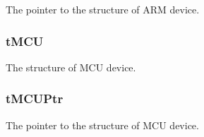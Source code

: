 The pointer to the structure of A\-R\-M device. \hypertarget{group___sys_glb_var_ga1da6113a394709910a14e2420a9d0a25}{
\subsubsection[{t\-M\-C\-U}]{ t\-M\-C\-U}}\label{group___sys_glb_var_ga1da6113a394709910a14e2420a9d0a25}
The structure of M\-C\-U device. \hypertarget{group___sys_glb_var_ga772826721d8d3133eaae07595c5cf644}{
\subsubsection[{t\-M\-C\-U\-Ptr}]{ t\-M\-C\-U\-Ptr}}\label{group___sys_glb_var_ga772826721d8d3133eaae07595c5cf644}
The pointer to the structure of M\-C\-U device. 